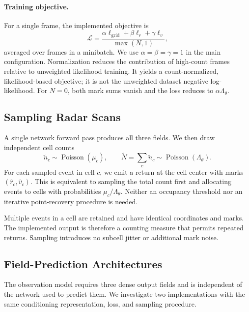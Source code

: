 \paragraph{Training objective.}
For a single frame, the implemented objective is
\begin{equation}
\mathcal{L}
=\frac{\alpha\ell_{\mathrm{grid}}+\beta\ell_r+\gamma\ell_v}
{\max(N,1)},
\label{eq:full_objective}
\end{equation}
averaged over frames in a minibatch.
We use $\alpha=\beta=\gamma=1$ in the main configuration.
Normalization reduces the contribution of high-count frames relative to unweighted likelihood training.
It yields a count-normalized, likelihood-based objective; it is not the unweighted dataset negative log-likelihood.
For $N=0$, both mark sums vanish and the loss reduces to $\alpha\Lambda_\theta$.

\subsection{Sampling Radar Scans}

A single network forward pass produces all three fields.
We then draw independent cell counts
\begin{equation}
\widetilde n_c\sim\operatorname{Poisson}(\mu_c),
\qquad
\widetilde N=\sum_c\widetilde n_c
\sim\operatorname{Poisson}(\Lambda_\theta).
\end{equation}
For each sampled event in cell $c$, we emit a return at the cell center with marks $(\widehat r_c,\widehat v_c)$.
This is equivalent to sampling the total count first and allocating events to cells with probabilities $\mu_c/\Lambda_\theta$.
Neither an occupancy threshold nor an iterative point-recovery procedure is needed.

Multiple events in a cell are retained and have identical coordinates and marks.
The implemented output is therefore a counting measure that permits repeated returns.
Sampling introduces no subcell jitter or additional mark noise.

\subsection{Field-Prediction Architectures}

The observation model requires three dense output fields and is independent of the network used to predict them.
We investigate two implementations with the same conditioning representation, loss, and sampling procedure.

